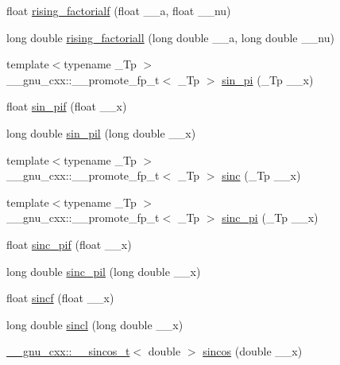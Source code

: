 \begin{DoxyCompactItemize}
float \hyperlink{group__gnu__math__spec__func_ga10da05b995a42f0b0625e61186af7449}{rising\+\_\+factorialf} (float \+\_\+\+\_\+a, float \+\_\+\+\_\+nu)
\item 
long double \hyperlink{group__gnu__math__spec__func_gac9a399ae01c315aa78a64b445795d974}{rising\+\_\+factoriall} (long double \+\_\+\+\_\+a, long double \+\_\+\+\_\+nu)
\item 
{\footnotesize template$<$typename \+\_\+\+Tp $>$ }\\\+\_\+\+\_\+gnu\+\_\+cxx\+::\+\_\+\+\_\+promote\+\_\+fp\+\_\+t$<$ \+\_\+\+Tp $>$ \hyperlink{group__gnu__math__spec__func_ga8fcd01a56e0c16d7568026c0bb4312eb}{sin\+\_\+pi} (\+\_\+\+Tp \+\_\+\+\_\+x)
\item 
float \hyperlink{group__gnu__math__spec__func_ga74fc8e2dd770850e7ea8bf8a28a71777}{sin\+\_\+pif} (float \+\_\+\+\_\+x)
\item 
long double \hyperlink{group__gnu__math__spec__func_ga0bda860961b0a121e266b278f260634b}{sin\+\_\+pil} (long double \+\_\+\+\_\+x)
\item 
{\footnotesize template$<$typename \+\_\+\+Tp $>$ }\\\+\_\+\+\_\+gnu\+\_\+cxx\+::\+\_\+\+\_\+promote\+\_\+fp\+\_\+t$<$ \+\_\+\+Tp $>$ \hyperlink{group__gnu__math__spec__func_ga6a11b9d949ab86f9fd170dcf0d3b1251}{sinc} (\+\_\+\+Tp \+\_\+\+\_\+x)
\item 
{\footnotesize template$<$typename \+\_\+\+Tp $>$ }\\\+\_\+\+\_\+gnu\+\_\+cxx\+::\+\_\+\+\_\+promote\+\_\+fp\+\_\+t$<$ \+\_\+\+Tp $>$ \hyperlink{group__gnu__math__spec__func_ga3dbc3831c1bd9f2a8be05496db9375a0}{sinc\+\_\+pi} (\+\_\+\+Tp \+\_\+\+\_\+x)
\item 
float \hyperlink{group__gnu__math__spec__func_gad92d43d5332c80d1a27c90bfe3f6417e}{sinc\+\_\+pif} (float \+\_\+\+\_\+x)
\item 
long double \hyperlink{group__gnu__math__spec__func_gaad38a6e40b1272391a26dbb32a684b3c}{sinc\+\_\+pil} (long double \+\_\+\+\_\+x)
\item 
float \hyperlink{group__gnu__math__spec__func_gaa87f0734cfe7823c932511ac2f0a876c}{sincf} (float \+\_\+\+\_\+x)
\item 
long double \hyperlink{group__gnu__math__spec__func_ga79a8fd931f5ad4f737e2931e636149ac}{sincl} (long double \+\_\+\+\_\+x)
\item 
\hyperlink{struct____gnu__cxx_1_1____sincos__t}{\+\_\+\+\_\+gnu\+\_\+cxx\+::\+\_\+\+\_\+sincos\+\_\+t}$<$ double $>$ \hyperlink{group__gnu__math__spec__func_ga8041c24b528475bcf8a4178e484652a3}{sincos} (double \+\_\+\+\_\+x)

\end{DoxyCompactItemize}
